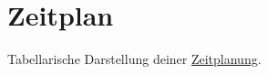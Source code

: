
\section{Zeitplan}
\label{sec:zeitplan}


Tabellarische Darstellung deiner \href{https://www.scribbr.de/anfang-abschlussarbeit/zeitplan-bachelorarbeit/}{Zeitplanung}.

